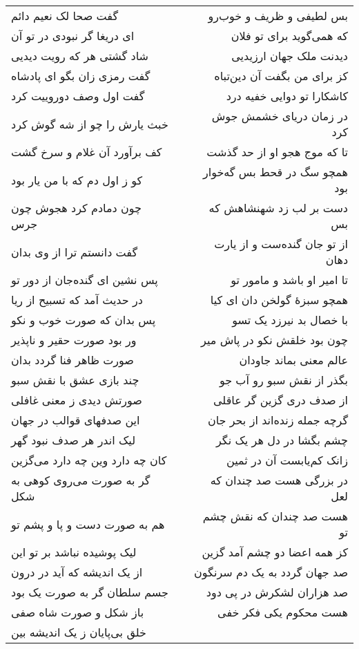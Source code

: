 \begin{center}
\begin{longtable}{l p{0.5cm} r}
گفت صحا لک نعیم دائم
&&
بس لطیفی و ظریف و خوب‌رو
\\
ای دریغا گر نبودی در تو آن
&&
که همی‌گوید برای تو فلان
\\
شاد گشتی هر که رویت دیدیی
&&
دیدنت ملک جهان ارزیدیی
\\
گفت رمزی زان بگو ای پادشاه
&&
کز برای من بگفت آن دین‌تباه
\\
گفت اول وصف دوروییت کرد
&&
کاشکارا تو دوایی خفیه درد
\\
خبث یارش را چو از شه گوش کرد
&&
در زمان دریای خشمش جوش کرد
\\
کف برآورد آن غلام و سرخ گشت
&&
تا که موج هجو او از حد گذشت
\\
کو ز اول دم که با من یار بود
&&
همچو سگ در قحط بس گه‌خوار بود
\\
چون دمادم کرد هجوش چون جرس
&&
دست بر لب زد شهنشاهش که بس
\\
گفت دانستم ترا از وی بدان
&&
از تو جان گنده‌ست و از یارت دهان
\\
پس نشین ای گنده‌جان از دور تو
&&
تا امیر او باشد و مامور تو
\\
در حدیث آمد که تسبیح از ریا
&&
همچو سبزهٔ گولخن دان ای کیا
\\
پس بدان که صورت خوب و نکو
&&
با خصال بد نیرزد یک تسو
\\
ور بود صورت حقیر و ناپذیر
&&
چون بود خلقش نکو در پاش میر
\\
صورت ظاهر فنا گردد بدان
&&
عالم معنی بماند جاودان
\\
چند بازی عشق با نقش سبو
&&
بگذر از نقش سبو رو آب جو
\\
صورتش دیدی ز معنی غافلی
&&
از صدف دری گزین گر عاقلی
\\
این صدفهای قوالب در جهان
&&
گرچه جمله زنده‌اند از بحر جان
\\
لیک اندر هر صدف نبود گهر
&&
چشم بگشا در دل هر یک نگر
\\
کان چه دارد وین چه دارد می‌گزین
&&
زانک کم‌یابست آن در ثمین
\\
گر به صورت می‌روی کوهی به شکل
&&
در بزرگی هست صد چندان که لعل
\\
هم به صورت دست و پا و پشم تو
&&
هست صد چندان که نقش چشم تو
\\
لیک پوشیده نباشد بر تو این
&&
کز همه اعضا دو چشم آمد گزین
\\
از یک اندیشه که آید در درون
&&
صد جهان گردد به یک دم سرنگون
\\
جسم سلطان گر به صورت یک بود
&&
صد هزاران لشکرش در پی دود
\\
باز شکل و صورت شاه صفی
&&
هست محکوم یکی فکر خفی
\\
خلق بی‌پایان ز یک اندیشه بین

\end{longtable}
\end{center}
